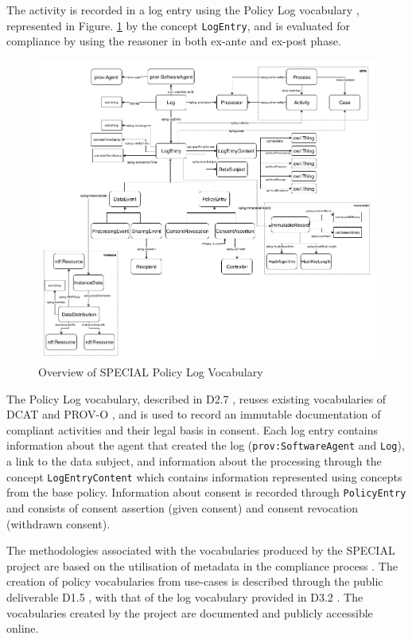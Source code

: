 The activity is recorded in a log entry using the Policy Log vocabulary \cite{bonatti_special_2018-1}, represented in Figure. \ref{fig:SPECIAL-policy-log-vocabulary} by the concept \texttt{LogEntry}, and is evaluated for compliance by using the reasoner in both ex-ante and ex-post phase. 
\begin{figure}[htbp]
    \centering
    \includegraphics[width=0.8\linewidth]{img/SPECIAL_logvocabulary.png}
    \caption{Overview of SPECIAL Policy Log Vocabulary \cite{bonatti_special_2018-1}}
    \label{fig:SPECIAL-policy-log-vocabulary}
\end{figure}

The Policy Log vocabulary, described in D2.7 \cite{kirrane_d2.7_2018}, reuses existing vocabularies of DCAT and PROV-O \cite{lebo_prov-o:_2013}, and is used to record an immutable documentation of compliant activities and their legal basis in consent. Each log entry contains information about the agent that created the log (\texttt{prov:SoftwareAgent} and \texttt{Log}), a link to the data subject, and information about the processing through the concept \texttt{LogEntryContent} which contains information represented using concepts from the base policy.
Information about consent is recorded through \texttt{PolicyEntry} and consists of consent assertion (given consent) and consent revocation (withdrawn consent).

The methodologies associated with the vocabularies produced by the SPECIAL project are based on the utilisation of metadata in the compliance process \cite{wenning_compliance_2018}. The creation of policy vocabularies from use-cases is described through the public deliverable D1.5 \cite{bonatti_d1.5_2018}, with that of the log vocabulary provided in D3.2 \cite{kirrane_d2.7_2018}. The vocabularies created by the project are documented and publicly accessible online.

